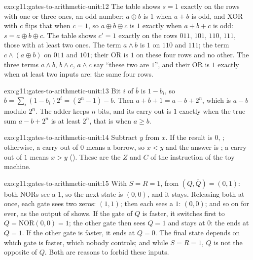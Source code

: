\begin{solution}{exo:g11:gates-to-arithmetic-unit:12}
The table shows $s = 1$ exactly on the rows with one or three ones, an odd number; $a \oplus b$ is $1$ when $a + b$ is
odd, and XOR with $c$ flips that when $c = 1$, so $a \oplus b \oplus c$ is $1$ exactly when $a + b + c$ is odd:
$s = a \oplus b \oplus c$. The table shows $c' = 1$ exactly on the rows $011$, $101$, $110$, $111$, those with at
least two ones. The term $a \wedge b$ is $1$ on $110$ and $111$; the term $c \wedge (a \oplus b)$ on $011$ and $101$;
their OR is $1$ on these four rows and no other. The three terms $a \wedge b$, $b \wedge c$, $a \wedge c$ say ``these
two are $1$'', and their OR is $1$ exactly when at least two inputs are: the same four rows.
\end{solution}

\begin{solution}{exo:g11:gates-to-arithmetic-unit:13}
Bit $i$ of $\overline{b}$ is $1 - b_i$, so $\overline{b} = \sum_i (1 - b_i) 2^i = (2^n - 1) - b$. Then
$a + \overline{b} + 1 = a - b + 2^n$, which is $a - b$ modulo $2^n$. The adder keeps $n$ bits, and its carry out is
$1$ exactly when the true sum $a - b + 2^n$ is at least $2^n$, that is when $a \ge b$.
\end{solution}

\begin{solution}{exo:g11:gates-to-arithmetic-unit:14}
Subtract $y$ from $x$. If the result is $0$, ; otherwise, a carry out of $0$ means a borrow, so $x < y$ and
the answer is ; a carry out of $1$ means $x > y$ (). These are the  $Z$
and $C$ of the instruction  of the toy machine.
\end{solution}

\begin{solution}{exo:g11:gates-to-arithmetic-unit:15}
With $S = R = 1$, from $(Q, \overline{Q}) = (0, 1)$: both NORs see a $1$, so the next state is $(0, 0)$, and it stays.
Releasing both at once, each gate sees two zeros: $(1, 1)$; then each sees a $1$: $(0, 0)$; and so on for ever, as
the output of  shows. If the gate of $Q$ is faster, it switches first to $Q = \text{NOR}(0, 0) = 1$;
the other gate then sees $Q = 1$ and stays at $0$: the  ends at $Q = 1$. If the other gate is faster, it ends at
$Q = 0$. The final state depends on which gate is faster, which nobody controls; and while $S = R = 1$, $\overline{Q}$
is not the opposite of $Q$. Both are reasons to forbid these inputs.
\end{solution}

